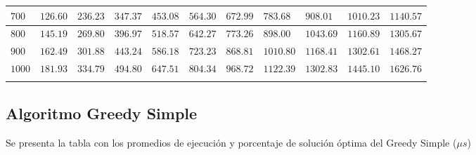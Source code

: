 \documentclass[12pt]{article}
\begin{document}
\begin{tabu}{|@{}*{11}{p{1.4cm}@{}|}}
$700$ & $126.60$ & $236.23$ & $347.37$ & $453.08$ & $564.30$ & $672.99$ & $783.68$ & $908.01$ & $1010.23$ & $1140.57$ \\\hline
$800$ & $145.19$ & $269.80$ & $396.97$ & $518.57$ & $642.27$ & $773.26$ & $898.00$ & $1043.69$ & $1160.89$ & $1305.67$ \\\hline
$900$ & $162.49$ & $301.88$ & $443.24$ & $586.18$ & $723.23$ & $868.81$ & $1010.80$ & $1168.41$ & $1302.61$ & $1468.27$ \\\hline
$1000$ & $181.93$ & $334.79$ & $494.80$ & $647.51$ & $804.34$ & $968.72$ & $1122.39$ & $1302.83$ & $1445.10$ & $1626.76$ \\\hline
{}%
\end{tabu}
\pagebreak
\subsection*{Algoritmo Greedy Simple}
Se presenta la tabla con los promedios de ejecuci\'on y porcentaje de soluci\'on \'optima del Greedy Simple ($\mu s$)\\
\end{document}
